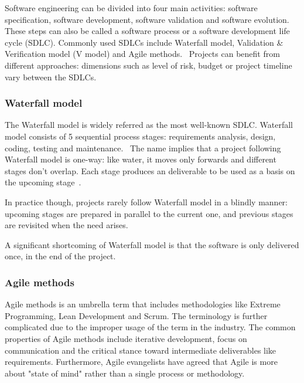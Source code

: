 Software engineering can be divided into four main activities: software specification, software development, software validation and software evolution.~\cite{sommerville_software_2016} These steps can also be called a software process or a software development life cycle (SDLC). Commonly used SDLCs include Waterfall model, Validation \& Verification model (V model) and Agile methods.~\cite{balaji_waterfall_2012} Projects can benefit from different approaches: dimensions such as level of risk, budget or project timeline vary between the SDLCs.~\cite{alshamrani_comparison_2015, cohen_introduction_2004} 


\subsubsection{Waterfall model}

The Waterfall model is widely referred as the most well-known SDLC. Waterfall model consists of 5 sequential process stages: requirements analysis, design, coding, testing and maintenance.~\cite{alshamrani_comparison_2015} The name implies that a project following Waterfall model is one-way: like water, it moves only forwards and different stages don't overlap. Each stage produces an deliverable to be used as a basis on the upcoming stage~\cite{balaji_waterfall_2012}.

In practice though, projects rarely follow Waterfall model in a blindly manner: upcoming stages are prepared in parallel to the current one, and previous stages are revisited when the need arises.~\cite{sommerville_software_2016}

A significant shortcoming of Waterfall model is that the software is only delivered once, in the end of the project. 



\subsubsection{Agile methods}

Agile methods is an umbrella term that includes methodologies like Extreme Programming, Lean Development and Scrum. The terminology is further complicated due to the improper usage of the term in the industry. The common properties of Agile methods include iterative development, focus on communication and the critical stance toward intermediate deliverables like requirements. Furthermore, Agile evangelists have agreed that Agile is more about "state of mind" rather than a single process or methodology.~\cite{cohen_introduction_2004}

